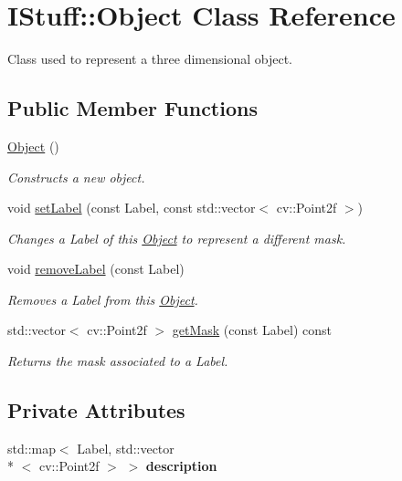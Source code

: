 \hypertarget{class_i_stuff_1_1_object}{\section{I\-Stuff\-:\-:Object Class Reference}
\label{class_i_stuff_1_1_object}
}


Class used to represent a three dimensional object.  


\subsection*{Public Member Functions}
\begin{DoxyCompactItemize}
\item 
\hypertarget{class_i_stuff_1_1_object_a40860402e64d8008fb42329df7097cdb}{\hyperlink{class_i_stuff_1_1_object_a40860402e64d8008fb42329df7097cdb}{Object} ()}\label{class_i_stuff_1_1_object_a40860402e64d8008fb42329df7097cdb}

\begin{DoxyCompactList}\small\item\em Constructs a new object. \end{DoxyCompactList}\item 
void \hyperlink{class_i_stuff_1_1_object_aee004eb2e471cda24ad4a58f6ae55b41}{set\-Label} (const Label, const std\-::vector$<$ cv\-::\-Point2f $>$)
\begin{DoxyCompactList}\small\item\em Changes a Label of this \hyperlink{class_i_stuff_1_1_object}{Object} to represent a different mask. \end{DoxyCompactList}\item 
void \hyperlink{class_i_stuff_1_1_object_ab9f6cf27353153dd8c9d3e55c7321f7f}{remove\-Label} (const Label)
\begin{DoxyCompactList}\small\item\em Removes a Label from this \hyperlink{class_i_stuff_1_1_object}{Object}. \end{DoxyCompactList}\item 
std\-::vector$<$ cv\-::\-Point2f $>$ \hyperlink{class_i_stuff_1_1_object_a469d14582bee7d25f546742d75f7eae4}{get\-Mask} (const Label) const 
\begin{DoxyCompactList}\small\item\em Returns the mask associated to a Label. \end{DoxyCompactList}\end{DoxyCompactItemize}
\subsection*{Private Attributes}
\begin{DoxyCompactItemize}
\item 
\hypertarget{class_i_stuff_1_1_object_a5513b3d190ca3af9395d66c79e736f06}{std\-::map$<$ Label, std\-::vector\\*
$<$ cv\-::\-Point2f $>$ $>$ {\bfseries description}}\label{class_i_stuff_1_1_object_a5513b3d190ca3af9395d66c79e736f06}

\end{DoxyCompactItemize}
